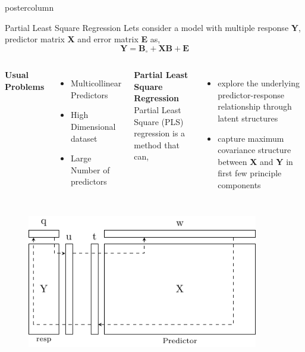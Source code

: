 \documentclass[9pt, final]{beamer}\usepackage[]{graphicx}\usepackage[]{color}
\begin{document}
\begin{frame}[fragile]
\begin{columns}
\begin{column}{.49\textwidth}
\begin{beamercolorbox}[center, wd=\textwidth]{postercolumn}
\begin{minipage}[T]{.98\textwidth}
{            %
            \begin{block}{Partial Least Square Regression} %
            Lets consider a model with multiple response \textbf{Y}, predictor matrix \textbf{X} and error matrix \textbf{E} as,
            \[ \mathbold{Y} = \boldsymbol{B}_\circ + \mathbold{XB} + \boldsymbol{E} \]            
			\begin{columns}[t, onlytextwidth]
				\textbf{Usual Problems}\\
					\begin{itemize}
						\item Multicollinear Predictors
						\item High Dimensional dataset
						\item Large Number of predictors
					\end{itemize}
				\textbf{Partial Least Square Regression}\\
					Partial Least Square (PLS) regression is a method that can,
					\begin{itemize}
						\item explore the underlying predictor-response relationship through latent structures
						\item capture maximum covariance structure between \textbf{X} and \textbf{Y} in first few principle components
					\end{itemize}
			\end{columns}
			\vspace{1cm}
            \begin{columns}[b]
              \begin{column}{0.45\textwidth}
                \begin{figure}
                \centering
                  \includegraphics[width = 0.9\textwidth]{figure/plsr}

\end{figure}
\end{column}
\end{columns}
\end{block}}
\end{minipage}
\end{beamercolorbox}
\end{column}
\end{columns}
\end{frame}
\end{document}
